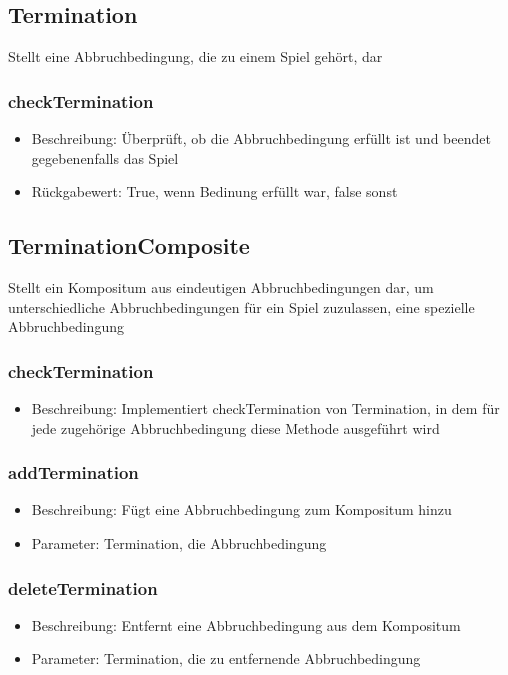 \documentclass[a4paper]{scrreprt}
\begin{document}
   \subsection{Termination}
   Stellt eine Abbruchbedingung, die zu einem Spiel gehört, dar
   \subsubsection{checkTermination}
      \begin{itemize}
          \item Beschreibung: Überprüft, ob die Abbruchbedingung erfüllt ist und beendet gegebenenfalls das Spiel
          \item Rückgabewert: True, wenn Bedinung erfüllt war, false sonst
      \end{itemize}
   
   \subsection{TerminationComposite}
   Stellt ein Kompositum aus eindeutigen Abbruchbedingungen dar, um unterschiedliche Abbruchbedingungen für ein Spiel zuzulassen, eine spezielle Abbruchbedingung
   \subsubsection{checkTermination}
      \begin{itemize}
         \item Beschreibung: Implementiert checkTermination von Termination, in dem für jede zugehörige Abbruchbedingung diese Methode ausgeführt wird
      \end{itemize}
  \subsubsection{addTermination}
     \begin{itemize}
        \item Beschreibung: Fügt eine Abbruchbedingung zum Kompositum hinzu
        \item Parameter: Termination, die Abbruchbedingung
     \end{itemize}
  \subsubsection{deleteTermination}
     \begin{itemize}
        \item Beschreibung: Entfernt eine Abbruchbedingung aus dem Kompositum
        \item Parameter: Termination, die zu entfernende Abbruchbedingung
     \end{itemize}
     
\end{document}
